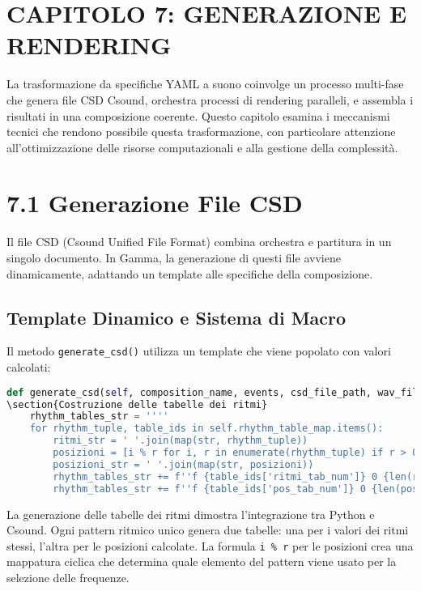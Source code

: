 
\section{CAPITOLO 7: GENERAZIONE E RENDERING}
La trasformazione da specifiche YAML a suono coinvolge un processo multi-fase che genera file CSD Csound, orchestra processi di rendering paralleli, e assembla i risultati in una composizione coerente. Questo capitolo esamina i meccanismi tecnici che rendono possibile questa trasformazione, con particolare attenzione all'ottimizzazione delle risorse computazionali e alla gestione della complessità.
\section{7.1 Generazione File CSD}
Il file CSD (Csound Unified File Format) combina orchestra e partitura in un singolo documento. In Gamma, la generazione di questi file avviene dinamicamente, adattando un template alle specifiche della composizione.
\subsection{Template Dinamico e Sistema di Macro}
Il metodo \texttt{generate\_csd()} utilizza un template che viene popolato con valori calcolati:

\begin{lstlisting}[language=Python]
def generate_csd(self, composition_name, events, csd_file_path, wav_file_path):
\section{Costruzione delle tabelle dei ritmi}
    rhythm_tables_str = ''''
    for rhythm_tuple, table_ids in self.rhythm_table_map.items():
        ritmi_str = ' '.join(map(str, rhythm_tuple))
        posizioni = [i % r for i, r in enumerate(rhythm_tuple) if r > 0]
        posizioni_str = ' '.join(map(str, posizioni))
        rhythm_tables_str += f''f {table_ids['ritmi_tab_num']} 0 {len(rhythm_tuple)} -2 {ritmi_str}\n''
        rhythm_tables_str += f''f {table_ids['pos_tab_num']} 0 {len(posizioni)} -2 {posizioni_str}\n''
\end{lstlisting}

La generazione delle tabelle dei ritmi dimostra l'integrazione tra Python e Csound. Ogni pattern ritmico unico genera due tabelle: una per i valori dei ritmi stessi, l'altra per le posizioni calcolate. La formula \texttt{i \% r} per le posizioni crea una mappatura ciclica che determina quale elemento del pattern viene usato per la selezione delle frequenze.

